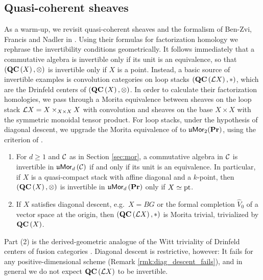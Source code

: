 \subsection*{Quasi-coherent sheaves}
As a warm-up, we revisit quasi-coherent sheaves and the formalism of Ben-Zvi, Francis and Nadler in \cite{BZFN,BZFN:app}.
Using their formulas for factorization homology we rephrase the invertibility conditions geometrically.
It follows immediately that a commutative algebra is invertible only if its unit is an
equivalence, so that $\left(\mathbf{QC}\left(X\right),\otimes\right)$ is invertible only if $X$ is a point.
Instead, a basic source of invertible
examples is convolution categories on loop stacks $\left(\mathbf{QC}\left(\mathcal{L} X\right),*\right)$, which are the Drinfeld centers of $\left(\mathbf{QC}\left(X\right),\otimes\right)$.
In order to calculate their factorization homologies, we pass through 
a Morita equivalence between 
sheaves on the loop stack $\mathcal{L} X= X\times_{X\times X} X$ with convolution and sheaves on the base $X\times X$ with the symmetric monoidal tensor product. 
For loop stacks, under the hypothesis of diagonal descent, we upgrade the Morita equivalence of \cite{BZFN:app} to $\mathfrak{u}\mathsf{Mor}_2(\mathbf{Pr})$, using the criterion of \cite[Theorem 2.26]{BJSS}.


\begin{introthm}
\label{thm:intro_A}
\leavevmode
\begin{enumerate}
\item For $d\geq1$ and $\mathcal{C}$ as in Section \ref{sec:mor}, a commutative algebra in $\mathcal{C}$ is
invertible in $\mathfrak{u}\mathsf{Mor}_d\left(\mathcal{C}\right)$ if and only if its unit is an equivalence. In particular, if $X$ is a quasi-compact stack with affine
diagonal and a $k$-point, then $\left(\mathbf{QC}\left(X\right),\otimes\right)$ is invertible in
$\mathfrak{u}\mathsf{Mor}_d\left(\mathbf{Pr}\right)$ only if $X\simeq\text{pt}$.
\item If $X$ satisfies diagonal descent, e.g.\ $X=BG$ or the formal completion $\widehat V_0$ of a
vector space at the origin, then $\left(\mathbf{QC}\left(\mathcal{L} X\right),*\right)$ is Morita trivial,
trivialized by $\mathbf{QC}\left(X\right)$.
\end{enumerate}
\end{introthm}

Part (2) is the derived-geometric analogue of the Witt triviality of Drinfeld centers of fusion
categories \cite{DMNO}. Diagonal descent is restrictive, however: It fails for any
positive-dimensional scheme (Remark \ref{rmk:diag_descent_fails}), and in general we do not
expect $\mathbf{QC}\left(\mathcal{L} X\right)$ to be invertible.

